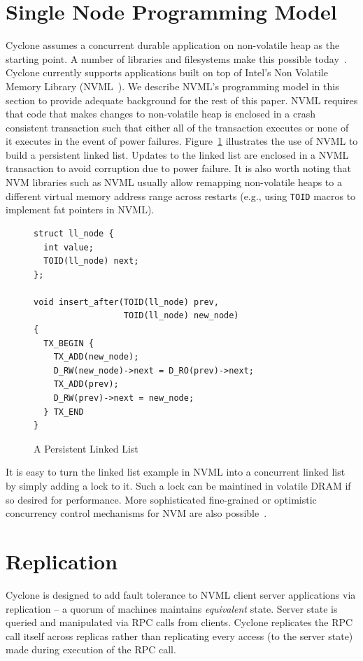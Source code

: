 \documentclass[letterpaper,twocolumn,10pt]{article}
\begin{document}
\section{Single Node Programming Model}
Cyclone assumes a concurrent durable application on non-volatile heap as the
starting point. A number of libraries and filesystems make this possible
today~\cite{nvml, dax, pmfs, mnemosyne, nvheaps, cdds}. Cyclone currently
supports applications built on top of Intel's Non Volatile Memory Library
(NVML~\cite{nvml}). We describe NVML's programming model in this section to
provide adequate background for the rest of this paper. NVML requires 
that code that makes changes to non-volatile heap is enclosed in a crash
consistent transaction such that either all of the transaction executes or none
of it executes in the event of power failures.
Figure~\ref{fig:example} illustrates the use of NVML to build a persistent
linked list. Updates to the linked list are enclosed in a NVML transaction to
avoid corruption due to power failure. It is also worth noting that NVM
libraries such as NVML usually allow remapping non-volatile heaps to a different
virtual memory address range across restarts (e.g., using {\tt TOID} macros to
implement fat pointers in NVML).

\begin{figure}
  { \scriptsize
\begin{verbatim}
struct ll_node {
  int value;
  TOID(ll_node) next;
};

void insert_after(TOID(ll_node) prev, 
                  TOID(ll_node) new_node)
{
  TX_BEGIN {
    TX_ADD(new_node);
    D_RW(new_node)->next = D_RO(prev)->next;
    TX_ADD(prev);
    D_RW(prev)->next = new_node;
  } TX_END
}

\end{verbatim}
  }
\caption{A Persistent Linked List}
\label{fig:example}
\end{figure}

It is easy to turn the linked list example in NVML into a concurrent linked list
by simply adding a lock to it. Such a lock can be maintined in volatile DRAM if
so desired for performance. More sophisticated fine-grained or optimistic
concurrency control mechanisms for NVM are also
possible~\cite{mnemosyne, cdds, nvheaps}.

\section{Replication}
Cyclone is designed to add fault tolerance to NVML client server applications
via replication -- a quorum of machines maintains \emph{equivalent} state.
Server state is queried and manipulated via RPC calls from clients.
Cyclone replicates the RPC call itself across replicas rather than replicating
every access (to the server state) made during execution of the RPC call.
\end{document}
